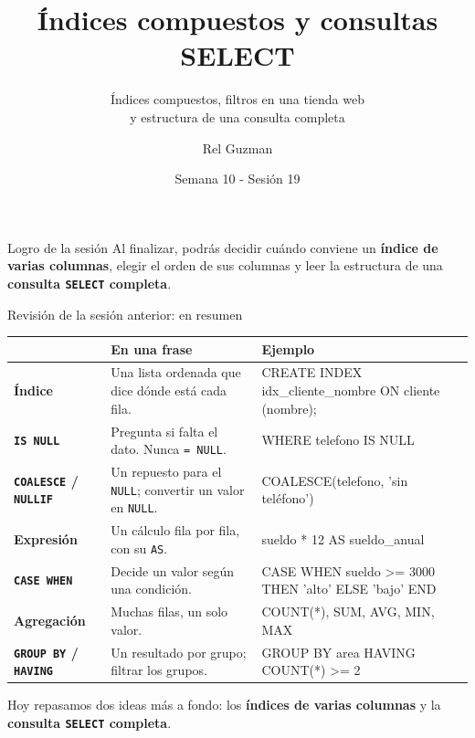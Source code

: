 \documentclass[aspectratio=169,10pt,c]{beamer}
\title{Índices compuestos y consultas SELECT}
\subtitle{Índices compuestos, filtros en una tienda web\\ y estructura de una consulta completa}
\date{Semana 10 - Sesión 19}
\author{Rel Guzman}
\begin{document}
{\maketitle}

\begin{frame}[c]
\begin{block}{Logro de la sesión}
Al finalizar, podrás decidir cuándo conviene un \textbf{índice de varias columnas}, elegir el orden de sus columnas y leer la estructura de una \textbf{consulta \texttt{SELECT} completa}.
\end{block}
\end{frame}
\begin{frame}{Revisión de la sesión anterior: en resumen}
\vspace{-0.2cm}
\begin{center}
\footnotesize
\renewcommand{\arraystretch}{1.2}
\begin{tabular}{>{\raggedright\bfseries}p{3.1cm}>{\raggedright\arraybackslash}p{4.9cm}>{\ttfamily\scriptsize\raggedright\arraybackslash}p{5.6cm}}
\toprule
& \bfseries En una frase & \normalfont\bfseries Ejemplo \\
\midrule
Índice & Una lista ordenada que dice dónde está cada fila. & CREATE INDEX idx\_cliente\_nombre ON cliente (nombre); \\
\texttt{IS NULL} & Pregunta si falta el dato. Nunca \texttt{= NULL}. & WHERE telefono IS NULL \\
\texttt{COALESCE} / \texttt{NULLIF} & Un repuesto para el \texttt{NULL}; convertir un valor en \texttt{NULL}. & COALESCE(telefono, 'sin teléfono') \\
Expresión & Un cálculo fila por fila, con su \texttt{AS}. & sueldo * 12 AS sueldo\_anual \\
\texttt{CASE WHEN} & Decide un valor según una condición. & CASE WHEN sueldo >= 3000 THEN 'alto' ELSE 'bajo' END \\
Agregación & Muchas filas, un solo valor. & COUNT(*), SUM, AVG, MIN, MAX \\
\texttt{GROUP BY} / \texttt{HAVING} & Un resultado por grupo; filtrar los grupos. & GROUP BY area HAVING COUNT(*) >= 2 \\
\bottomrule
\end{tabular}
\end{center}
\vspace{0.05cm}
\small Hoy repasamos dos ideas más a fondo: los \textbf{índices de varias columnas} y la \textbf{consulta \texttt{SELECT} completa}.
\end{frame}
\end{document}
